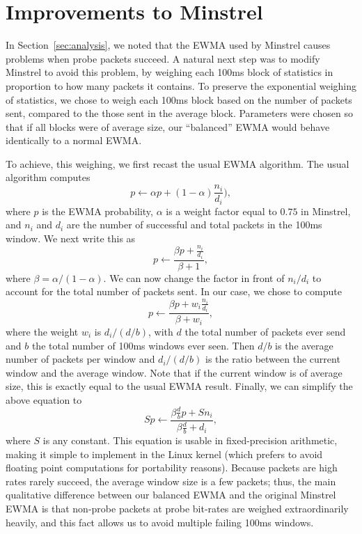\documentclass[letterpaper,twocolumn,10pt]{article}
\begin{document}
\section{Improvements to Minstrel}

In Section~\ref{sec:analysis}, we noted that the EWMA used by Minstrel causes problems when probe packets succeed.  A natural next step was to modify Minstrel to avoid this problem, by weighing each 100ms block of statistics in proportion to how many packets it contains.  To preserve the exponential weighing of statistics, we chose to weigh each 100ms block based on the number of packets sent, compared to the those sent in the average block.  Parameters were chosen so that if all blocks were of average size, our ``balanced'' EWMA would behave identically to a normal EWMA.

To achieve, this weighing, we first recast the usual EWMA algorithm.  The usual algorithm computes $$p \gets \alpha p + (1 - \alpha) \frac{n_i}{d_i}),$$ where $p$ is the EWMA probability, $\alpha$ is a weight factor equal to $0.75$ in Minstrel, and $n_i$ and $d_i$ are the number of successful and total packets in the 100ms window.  We next write this as $$p \gets \frac{\beta p + \frac{n_i}{d_i}}{\beta + 1},$$ where $\beta = \alpha / (1 - \alpha)$.  We can now change the factor in front of $n_i / d_i$ to account for the total number of packets sent.  In our case, we chose to compute $$p \gets \frac{\beta p + w_i \frac{n_i}{d_i}}{\beta + w_i},$$ where the weight $w_i$ is $d_i / (d / b)$, with $d$ the total number of packets ever send and $b$ the total number of 100ms windows ever seen.  Then $d / b$ is the average number of packets per window and $d_i / (d / b)$ is the ratio between the current window and the average window.  Note that if the current window is of average size, this is exactly equal to the usual EWMA result.  Finally, we can simplify the above equation to $$S p \gets \frac{\beta \frac{d}{b} p + S n_i}{\beta \frac{d}{b} + d_i},$$ where $S$ is any constant.  This equation is usable in fixed-precision arithmetic, making it simple to implement in the Linux kernel (which prefers to avoid floating point computations for portability reasons).  Because packets are high rates rarely succeed, the average window size is a few packets; thus, the main qualitative difference between our balanced EWMA and the original Minstrel EWMA is that non-probe packets at probe bit-rates are weighed extraordinarily heavily, and this fact allows us to avoid multiple failing 100ms windows.
\end{document}
